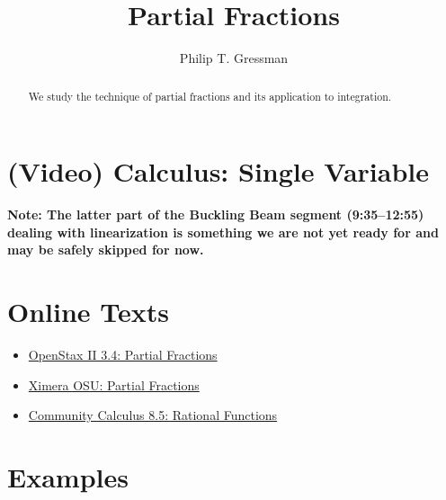 \documentclass{ximera}
\title{Partial Fractions}
\author{Philip T. Gressman}
\begin{document}
\begin{abstract}
We study the technique of partial fractions and its application to integration.
\end{abstract}
\maketitle

\section*{(Video) Calculus: Single Variable}

\textbf{Note: The latter part of the Buckling Beam segment (9:35--12:55) dealing with linearization is something we are not yet ready for and may be safely skipped for now.}

\section*{Online Texts}
\begin{itemize}
\item \href{https://openstax.org/books/calculus-volume-2/pages/3-4-partial-fractions}{OpenStax II 3.4: Partial Fractions}
\item \href{https://ximera.osu.edu/mooculus/calculus2/partialFractions/titlePage}{Ximera OSU: Partial Fractions}
\item \href{https://www.whitman.edu/mathematics/calculus_online/section08.05.html}{Community Calculus 8.5: Rational Functions}
\end{itemize}


\section*{Examples}

\begin{example}

\end{example}

\begin{example}

\end{example}
\end{document}
